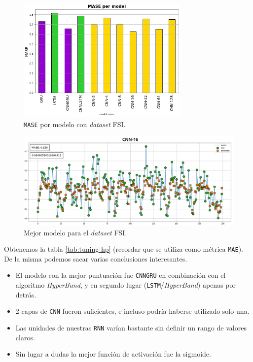\documentclass[a4paper,12pt]{article}
\begin{document}
\begin{figure}[H]
	\begin{center}
	\includegraphics[width=0.75\textwidth]{mase_per_model_fsi.png}
  	\caption{\texttt{MASE} por modelo con \textit{dataset} FSI.}
  	\label{fig:mase_per_model_fsi}
  	\end{center}
\end{figure}

\begin{figure}[H]
	\begin{center}
	\includegraphics[width=1\textwidth]{best_model_fsi.png}
  	\caption{Mejor modelo para el \textit{dataset} FSI.}
  	\label{fig:best_model_fsi}
  	\end{center}
\end{figure}

Obtenemos la tabla \ref{tab:tuning-hp} (recordar que se utiliza como métrica \texttt{MAE}). De la misma podemos sacar varias conclusiones interesantes.
\begin{itemize}
	\item El modelo con la mejor puntuación fue \texttt{CNNGRU} en combinación con el algoritmo \textit{HyperBand}, y en segundo lugar (\texttt{LSTM}/\textit{HyperBand}) apenas por detrás.
	\item 2 capas de \texttt{CNN} fueron suficientes, e incluso podría haberse utilizado solo una.
	\item Las unidades de nuestras \texttt{RNN} varían bastante sin definir un rango de valores claros.
	\item Sin lugar a dudas la mejor función de activación fue la sigmoide.
\end{itemize}
\end{document}
